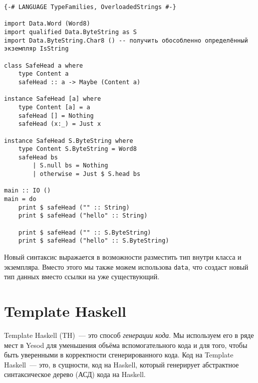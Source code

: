 \begin{lstlisting}
{-# LANGUAGE TypeFamilies, OverloadedStrings #-}

import Data.Word (Word8)
import qualified Data.ByteString as S
import Data.ByteString.Char8 () -- получить обособленно определённый экземпляр IsString

class SafeHead a where
    type Content a
    safeHead :: a -> Maybe (Content a)

instance SafeHead [a] where
    type Content [a] = a
    safeHead [] = Nothing
    safeHead (x:_) = Just x

instance SafeHead S.ByteString where
    type Content S.ByteString = Word8
    safeHead bs
        | S.null bs = Nothing
        | otherwise = Just $ S.head bs

main :: IO ()
main = do
    print $ safeHead ("" :: String)
    print $ safeHead ("hello" :: String)

    print $ safeHead ("" :: S.ByteString)
    print $ safeHead ("hello" :: S.ByteString)
\end{lstlisting}

Новый синтаксис выражается в возможности разместить тип внутри класса и экземпляра. Вместо этого мы также можем использова \lstinline'data', что создаст новый тип данных вместо ссылки на уже существующий.


\section{Template Haskell}

Template Haskell (TH)~--- это способ \emph{генерации кода}. Мы используем его в ряде мест в Yesod для уменьшения объёма вспомогательного кода и для того, чтобы быть уверенными в корректности сгенерированного кода. Код на Template Haskell~--- это, в сущности, код на Haskell, который генерирует абстрактное синтаксическое дерево (АСД) кода на Haskell.

